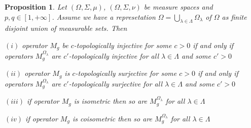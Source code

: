 \documentclass[12pt]{article}
\newtheorem{proposition}[theorem]{Proposition}
\begin{document}
\begin{proposition}\label{MultOpDecompDecomp} Let $(\Omega,\Sigma,\mu)$,
    $(\Omega,\Sigma,\nu)$ be measure spaces and $p,q\in[1,+\infty]$. Assume we
    have a represetation $\Omega=\bigcup_{\lambda\in\Lambda}\Omega_\lambda$ of
    $\Omega$ as finite disjoint union of measurable sets. Then

    $(i)$ operator $M_g$ be $c$-topologically injective for some $c>0$ if and
    only if operators $M_g^{\Omega_\lambda}$ are $c'$-topologically injective
    for all $\lambda\in\Lambda$ and some $c'>0$

    $(ii)$ operator $M_g$ is $c$-topologically surjective for some $c>0$ if and
    only if operators $M_g^{\Omega_\lambda}$ are $c'$-topologically surjective
    for all $\lambda\in\Lambda$ and some $c'>0$

    $(iii)$ if operator $M_g$ is isometric then so are $M_g^{\Omega_\lambda}$
    for all $\lambda\in\Lambda$

    $(iv)$ if operator $M_g$ is coisometric then so are $M_g^{\Omega_\lambda}$
    for all $\lambda\in\Lambda$

\end{proposition}
\end{document}
